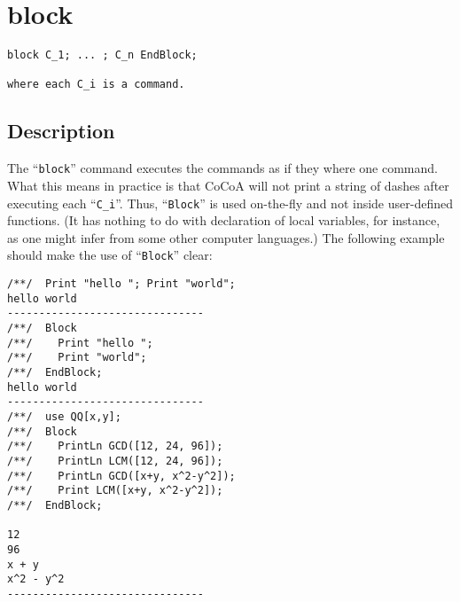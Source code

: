 \documentclass[a4paper]{mybook}
\newenvironment{command}{}{} %
\begin{document}
\section{block}
\label{block}
\begin{command} %


\begin{Verbatim}[label=syntax, rulecolor=\color{MidnightBlue},
frame=single]
block C_1; ... ; C_n EndBlock;

where each C_i is a command.
\end{Verbatim}


\subsection*{Description}

The ``\verb&block&'' command executes the commands as if they where one
command.  What this means in practice is that CoCoA will not print a
string of dashes after executing each ``\verb&C_i&''.  Thus, ``\verb&Block&'' is used
on-the-fly and not inside user-defined functions.  (It has nothing to
do with declaration of local variables, for instance, as one might
infer from some other computer languages.)  The following example
should make the use of ``\verb&Block&'' clear:
\begin{Verbatim}[label=example, rulecolor=\color{PineGreen}, frame=single]
/**/  Print "hello "; Print "world";
hello world
-------------------------------
/**/  Block
/**/    Print "hello ";
/**/    Print "world";
/**/  EndBlock;
hello world
-------------------------------
/**/  use QQ[x,y];
/**/  Block
/**/    PrintLn GCD([12, 24, 96]);
/**/    PrintLn LCM([12, 24, 96]);
/**/    PrintLn GCD([x+y, x^2-y^2]);
/**/    Print LCM([x+y, x^2-y^2]);
/**/  EndBlock;

12
96
x + y
x^2 - y^2
-------------------------------
\end{Verbatim}


\end{command} %
\end{document}
